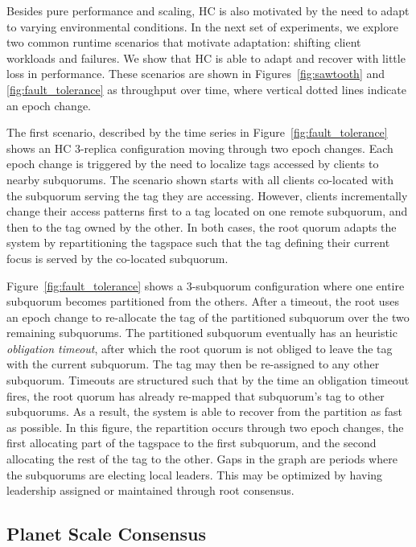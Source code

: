 \documentclass[11pt,conference]{IEEEtran}
\begin{document}
Besides pure performance and scaling, HC is also motivated by the need to adapt to 
varying environmental conditions.
In the next set of experiments, we explore two common runtime scenarios that motivate 
adaptation: shifting client workloads and failures.
We show that HC is able to adapt and recover with little loss in performance. These 
scenarios are shown in Figures~\ref{fig:sawtooth} and 
\ref{fig:fault_tolerance} as throughput over time, where vertical dotted 
lines indicate an epoch change.

The first scenario, described by the time series in Figure~\ref{fig:fault_tolerance} 
shows an HC 3-replica configuration moving through two epoch changes.
Each epoch change is triggered by the need to localize tags accessed by
clients to nearby subquorums.
The scenario shown starts with all clients co-located with the subquorum serving the tag 
they are accessing.
However, clients incrementally change their access patterns first to a tag located on 
one remote subquorum, and then to the tag owned by the other.
In both cases, the root quorum adapts the system by repartitioning the tagspace such 
that the tag defining their current focus is served by the co-located subquorum.

Figure~\ref{fig:fault_tolerance} shows a 3-subquorum configuration where one 
entire subquorum becomes partitioned from the others.
After a timeout, the root uses an epoch change to re-allocate the tag of the partitioned 
subquorum over the two remaining subquorums.
The partitioned subquorum eventually has an heuristic \emph{obligation timeout}, after 
which the  root quorum is not obliged to leave the tag with the current subquorum.
The tag may then be re-assigned to any other subquorum.
Timeouts are structured such that by the time an obligation timeout fires, the root 
quorum has already re-mapped that subquorum's tag to other subquorums.
As a result, the system is able to recover from the partition as fast as possible.
In this figure, the repartition occurs through two epoch changes, the first allocating 
part of the tagspace to the first subquorum, and the second allocating the rest of the 
tag to the other.
Gaps in the graph are periods where the subquorums are electing local leaders.
This may be optimized by having leadership assigned or maintained through root consensus.

\subsection{Planet Scale Consensus}
\end{document}
